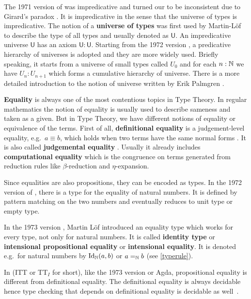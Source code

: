 The 1971 version  of \mltt \cite{per:71} was impredicative and turned our to be inconsistent due to Girard's paradox \cite{hurkens1995simplification}. It is impredicative in the sense that the universe of types is impredicative. The notion of a \textbf{universe of types} was first used by Martin-L\"{o}f \cite{Martin-Lof-1973} to describe the type of all types and usually denoted as $\mathsf{U}$. An impredicative universe $\mathsf{U}$ has an axiom $\mathsf{U} : \mathsf{U}$.
Starting from the 1972 version \cite{Martin-Lof-1972}, a predicative hierarchy of universes is adopted and they are more widely used. Briefly speaking, it starts from a universe of small types called $U_0$ and for each $n : \mathbb{N}$ we have $U_n : U_{n+1}$ which forms a cumulative hierarchy of universe. There is a more detailed introduction to the notion of universe written by Erik Palmgren \cite{Palmgren98onuniverses}.


\textbf{Equality} is always one of the most contentious topics in Type Theory.
In regular mathematics the notion of equality is usually used to describe sameness and taken as a given.
But in Type Theory, we have different notions of equality or equivalence of the terms.
First of all, \textbf{definitional equality} is a judgement-level equality, e.g.\  $a \equiv b$, which holds when two terms have the same normal forms \cite{nor:90}. It is also called \textbf{judgemental equality} \cite{martin1984intuitionistic}. Usually it already includes \textbf{computational equality} which is the congruence on terms generated from reduction rules like $\beta$-reduction and $\eta$-expansion. 


Since equalities are also propositions, they can be encoded as types.
In the 1972 version of \mltt, there is a type for the equality of natural numbers. It is defined by pattern matching on the two numbers and eventually reduces to unit type or empty type.

In the 1973 version \cite{Martin-Lof-1973}, Martin L\"{o}f introduced an equality type which works for every type, not only for natural numbers. It is called \textbf{identity type} or \textbf{intensional propositional equality} or \textbf{intensional equality}. It is denoted e.g.\ for natural numbers by $\text{Id}_{\mathbb{N}}(a, b)$ or $a =_{\mathbb{N}} b$ (see \autoref{typerule}).


In \itt (ITT or TT$_I$ for short), like the 1973 version or Agda, propositional equality is different from definitional equality. 
The definitional equality is always decidable hence type checking that depends on definitional equality is
decidable as well~\cite{alti:lics99}.



